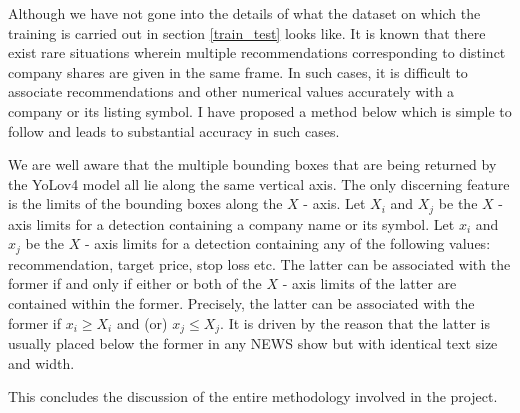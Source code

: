 Although we have not gone into the details of what the dataset on
which the training is carried out in section \ref{train_test} looks
like. It is known that there exist rare situations wherein multiple
recommendations corresponding to distinct company shares are given in
the same frame. In such cases, it is difficult to associate
recommendations and other numerical values accurately with a company
or its listing symbol. I have proposed a method below which is simple
to follow and leads to substantial accuracy in such cases. \par

We are well aware that the multiple bounding boxes that are being
returned by the YoLov4 model all lie along the same vertical axis.
The only discerning feature is the limits of the bounding boxes along
the $X$ - axis. Let $X_i$ and $X_j$ be the $X$ - axis limits for a
detection containing a company name or its symbol. Let $x_i$ and
$x_j$ be the $X$ - axis limits for a detection containing any of the
following values: recommendation, target price, stop loss etc. The
latter can be associated with the former if and only if either or
both of the $X$ - axis limits of the latter are contained within the
former. Precisely, the latter can be associated with the former if
$x_{i} \geqslant X_{i}$ and (or)  $x_{j} \leqslant X_{j}$. It is
driven by the reason that the latter is usually placed below the
former in any NEWS show but with identical text size and width. \par

This concludes the discussion of the entire methodology involved in the project.
